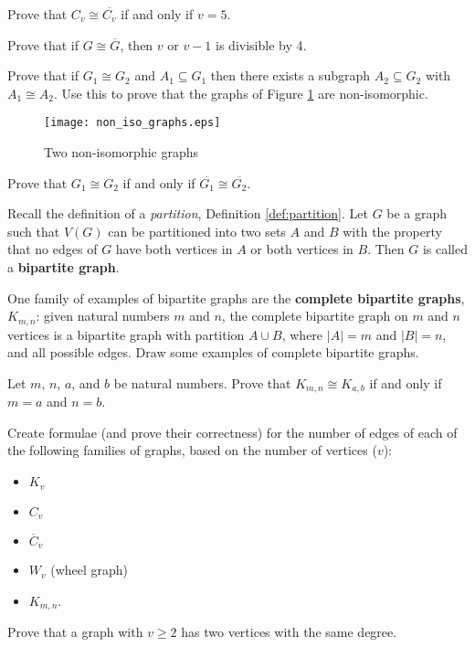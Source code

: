 \begin{exercise} Prove that $C_v \cong \overline{C_v}$ if and only if $v = 5$.
\end{exercise}

\begin{exercise} Prove that if $G \cong \overline{G}$, then $v$ or $v-1$ is divisible by 4.
\end{exercise}

\begin{exercise} Prove that if $G_1 \cong G_2$ and $A_1 \subseteq G_1$ then there exists a subgraph $A_2 \subseteq G_2$ with $A_1 \cong A_2$.  Use this to prove that the graphs of Figure \ref{fig:non-iso_graphs} are non-isomorphic.
\end{exercise}
\begin{figure}[hb]
    \begin{center}
        \texttt{[image: non\_iso\_graphs.eps]}
        \label{fig:non-iso_graphs}
        \caption{Two non-isomorphic graphs}
    \end{center}
\end{figure}

\begin{exercise} Prove that $G_1 \cong G_2$ if and only if $\overline{G_1} \cong \overline{G_2}$.
\end{exercise}

\begin{exercise} Recall the definition of a \textit{partition}, Definition \ref{def:partition}.  Let $G$ be a graph such that $V(G)$ can be partitioned into two sets $A$ and $B$ with the property that no edges of $G$ have both vertices in $A$ or both vertices in $B$.  Then $G$ is called a \textbf{bipartite graph}.

One family of examples of bipartite graphs are the \textbf{complete bipartite graphs}, $K_{m,n}$: given natural numbers $m$ and $n$, the complete bipartite graph on $m$ and $n$ vertices is a bipartite graph with partition $A\cup B$, where $|A| = m$ and $|B| = n$, and all possible edges.  Draw some examples of complete bipartite graphs.

Let $m$, $n$, $a$, and $b$ be natural numbers. Prove that $K_{m,n} \cong K_{a,b}$ if and only if $m = a$ and $n = b$.
\end{exercise}

\begin{exercise} Create formulae (and prove their correctness) for the number of edges of each of the following families of graphs, based on the number of vertices ($v$):
\begin{itemize}
    \item $K_v$
    \item $C_v$
    \item $\overline{C}_v$
    \item $W_v$ (wheel graph)
    \item $K_{m,n}$.
\end{itemize}
\end{exercise}

\begin{exercise} Prove that a graph with $v \geq 2$ has two vertices with the same degree.
\end{exercise}
